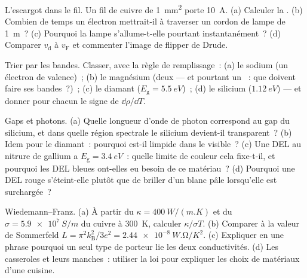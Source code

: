 \begin{exercise}[$\star$]\label{exo:b3:electrons-in-solids:2}
L'escargot dans le fil. Un fil de cuivre de \qty{1}{mm^2} porte
\qty{10}{A}. (a) Calculer la . (b) Combien de temps
un électron mettrait-il à traverser un cordon de lampe de
\qty{1}{m}~? (c) Pourquoi la lampe s'allume-t-elle pourtant
instantanément~? (d) Comparer $v_{\text{d}}$ à $v_{\text{F}}$ et
commenter l'image de flipper de Drude.
\end{exercise}

\begin{exercise}[$\star$]\label{exo:b3:electrons-in-solids:3}
Trier par les bandes. Classer, avec la règle de remplissage~: (a) le
sodium (un électron de valence)~; (b) le magnésium (deux --- et
pourtant un ~: que doivent faire ses bandes~?)~; (c) le diamant
($E_{\text{g}} = \qty{5.5}{eV}$)~; (d) le silicium
($\qty{1.12}{eV}$) --- et donner pour chacun le signe de
$\dd\rho/\dd T$.
\end{exercise}

\begin{exercise}[$\star$]\label{exo:b3:electrons-in-solids:4}
Gaps et photons. (a) Quelle longueur d'onde de photon correspond au
gap du silicium, et dans quelle région spectrale le silicium
devient-il transparent~? (b) Idem pour le diamant~: pourquoi est-il
limpide dans le visible~? (c) Une DEL au nitrure de gallium a
$E_{\text{g}} =
\qty{3.4}{eV}$~: quelle limite de couleur cela fixe-t-il, et pourquoi
les DEL bleues ont-elles eu besoin de ce matériau~? (d) Pourquoi une
DEL rouge s'éteint-elle plutôt que de briller d'un blanc pâle
lorsqu'elle est surchargée~?
\end{exercise}

\begin{exercise}[$\star\star$]\label{exo:b3:electrons-in-solids:5}
Wiedemann--Franz. (a) À partir du $\kappa =
\qty{400}{W/(m.K)}$ et du $\sigma = \qty{5.9e7}{S/m}$ du cuivre à
\qty{300}{K}, calculer $\kappa/\sigma T$. (b) Comparer à la valeur de
Sommerfeld $L = \pi^2k_{\text{B}}^2/3e^2 =
\qty{2.44e-8}{W.\ohm/K^2}$. (c) Expliquer en une phrase pourquoi un
seul type de porteur lie les deux conductivités. (d) Les casseroles
et leurs manches~: utiliser la loi pour expliquer les choix de
matériaux d'une cuisine.
\end{exercise}

